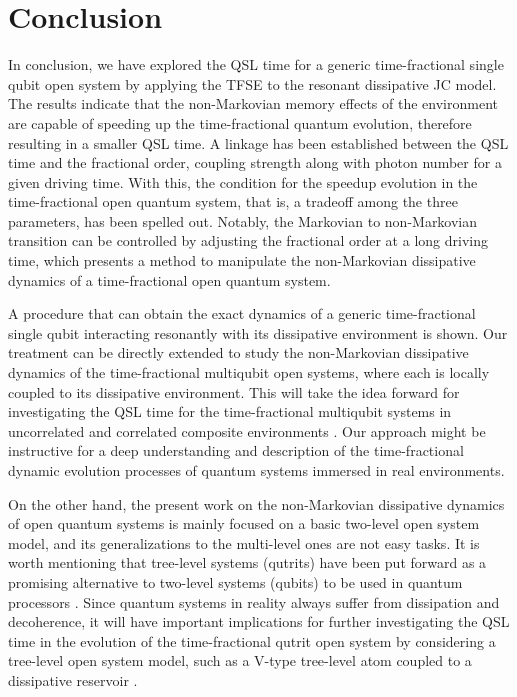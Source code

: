 \documentclass[
showpacs,  %
showkeys,  %
aps,       %
amsthm,    %
amsmath,   %
amsfonts,  %
amssymb    %
]{revtex4-1}          %
\begin{document}
\section{Conclusion}
\label{Sec:5}
In conclusion, we have explored the QSL time for a generic time-fractional single qubit open system by applying the TFSE to the resonant dissipative JC model. The results indicate that the non-Markovian memory effects of the environment are capable of speeding up the time-fractional quantum evolution, therefore resulting in a smaller QSL time. A linkage has been established between the QSL time and the fractional order, coupling strength along with photon number for a given driving time. With this, the condition for the speedup evolution in the time-fractional open quantum system, that is, a tradeoff among the three parameters, has been spelled out. Notably, the Markovian to non-Markovian transition can be controlled by adjusting the fractional order at a long driving time, which presents a method to manipulate the non-Markovian dissipative dynamics of a time-fractional open quantum system.

A procedure that can obtain the exact dynamics of a generic time-fractional single qubit interacting resonantly with its dissipative environment is shown. Our treatment can be directly extended to study the non-Markovian dissipative dynamics of the time-fractional multiqubit open systems, where each is locally coupled to its dissipative environment. This will take the idea forward for investigating the QSL time for the time-fractional multiqubit systems in uncorrelated and correlated composite environments \cite{Bellomo2007,Laine2012}. Our approach might be instructive for a deep understanding and description of the time-fractional dynamic evolution processes of quantum systems immersed in real environments.

On the other hand, the present work on the non-Markovian dissipative dynamics of open quantum systems is mainly focused on a basic two-level open system model, and its generalizations to the multi-level ones are not easy tasks. It is worth mentioning that tree-level systems (qutrits) have been put forward as a promising alternative to two-level systems (qubits) to be used in quantum processors \cite{Lanyon2008,Kumar2016}. Since quantum systems in reality always suffer from dissipation and decoherence, it will have important implications for further investigating the QSL time in the evolution of the time-fractional qutrit open system by considering a tree-level open system model, such as a V-type tree-level atom coupled to a dissipative reservoir \cite{Scully1997,Gu2012}.
\end{document}
